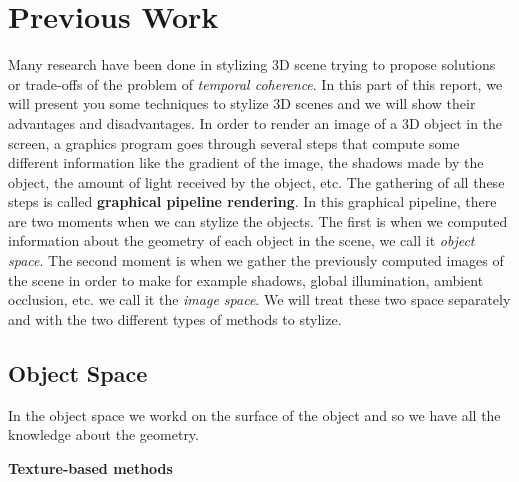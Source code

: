 \chapter{Previous Work}

Many research have been done in stylizing 3D scene\cite{schmid_overcoat:_2011, praun_real-time_2001, klein_non-photorealistic_2000, benard_dynamic_2009, benard_dynamic_2010, freudenberg_walk-through_2001, benard_state---art_2011} trying to propose solutions or trade-offs of the problem of \textit{temporal coherence}. In this part of this report, we will present you some techniques to stylize 3D scenes and we will show their advantages and disadvantages. In order to render an image of a 3D object in the screen, a graphics program goes through several steps that compute some different information like the gradient of the image, the shadows made by the object, the amount of light received by the object, etc. The gathering of all these steps is called \textbf{graphical pipeline rendering}. In this graphical pipeline, there are two moments when we can stylize the objects. The first is when we computed information about the geometry of each object in the scene, we call it \textit{object space}. The second moment is when we gather the previously computed images of the scene in order to make for example shadows, global illumination, ambient occlusion, etc. we call it the \textit{image space}. We will treat these two space separately and with the two different types of methods to stylize.



\section{Object Space}

In the object space we workd on the surface of the object and so we have all the knowledge about the geometry.


\textbf{Texture-based methods}

